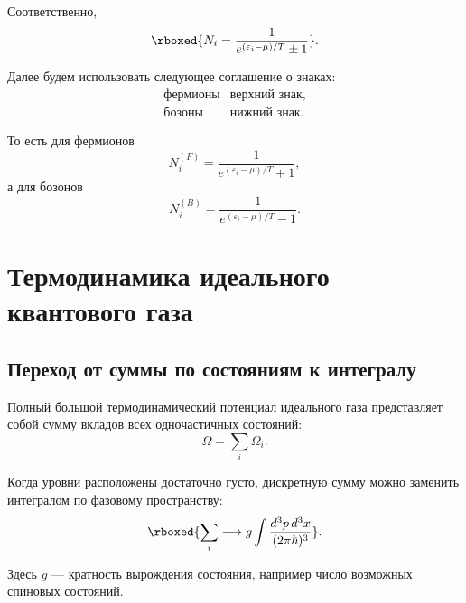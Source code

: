 \documentclass[../final.tex]{subfiles}
\begin{document}
Соответственно,
%
\[
    \rboxed{
        N_i
        =
        \frac{1}{
            e^{(\varepsilon_i-\mu)/T}\pm1
        }
    }.
\]

Далее будем использовать следующее соглашение о знаках:
%
\begin{equation*}
    \begin{array}{c|c}
        \text{фермионы} & \text{верхний знак},\\
        \text{бозоны}   & \text{нижний знак}.
    \end{array}
\end{equation*}

То есть для фермионов
%
\begin{equation*}
    N_i^{(F)}
    =
    \frac{1}{
        e^{(\varepsilon_i-\mu)/T}+1
    },
\end{equation*}
%
а для бозонов
%
\begin{equation*}
    N_i^{(B)}
    =
    \frac{1}{
        e^{(\varepsilon_i-\mu)/T}-1
    }.
\end{equation*}


\section{Термодинамика идеального квантового газа}


\subsection{Переход от суммы по состояниям к интегралу}

Полный большой термодинамический потенциал идеального газа
представляет собой сумму вкладов всех одночастичных состояний:
%
\begin{equation*}
    \Omega
    =
    \sum_i
    \Omega_i.
\end{equation*}

Когда уровни расположены достаточно густо, дискретную сумму можно
заменить интегралом по фазовому пространству:
%
\[
    \rboxed{
        \sum_i
        \longrightarrow
        g
        \int
        \frac{
            d^3p\,d^3x
        }{
            (2\pi\hbar)^3
        }
    }.
\]

Здесь $g$ --- кратность вырождения состояния, например число
возможных спиновых состояний.
\end{document}
